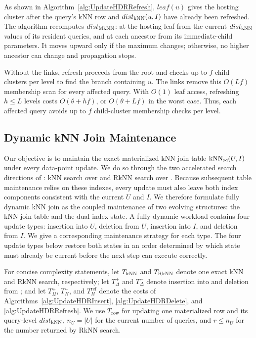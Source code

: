 As shown in Algorithm~\ref{alg:UpdateHDRRefresh}, $leaf(u)$ gives the hosting cluster after the query's kNN row and $dist_{\operatorname{kNN}}(u,I)$ have already been refreshed. The algorithm recomputes $dist_{\operatorname{MkNN}}$: at the hosting leaf from the current $dist_{\operatorname{kNN}}$ values of its resident queries, and at each ancestor from its immediate-child parameters. It moves upward only if the maximum changes; otherwise, no higher ancestor can change and propagation stops.

Without the links, refresh proceeds from the root and checks up to $f$ child clusters per level to find the branch containing $u$. The links remove this $O(Lf)$ membership scan for every affected query. With $O(1)$ leaf access, refreshing $h\leq L$ levels costs $O(\theta+hf)$, or $O(\theta+Lf)$ in the worst case. Thus, each affected query avoids up to $f$ child-cluster membership checks per level.

\subsection{Dynamic kNN Join Maintenance}
\label{subsec:dynamic-maintenance}

Our objective is to maintain the exact materialized kNN join table $\operatorname{kNN}_{\bowtie}(U,I)$ under every data-point update. We do so through the two accelerated search directions of \dualtree: kNN search over \deltatree and RkNN search over \hdrtree. Because subsequent table maintenance relies on these indexes, every update must also leave both index components consistent with the current $U$ and $I$. We therefore formulate fully dynamic kNN join as the coupled maintenance of two evolving structures: the kNN join table and the dual-index state. A fully dynamic workload contains four update types: insertion into $U$, deletion from $U$, insertion into $I$, and deletion from $I$. We give a corresponding maintenance strategy for each type. The four update types below restore both states in an order determined by which state must already be current before the next step can execute correctly.

For concise complexity statements, let $T_{\operatorname{kNN}}$ and $T_{\operatorname{RkNN}}$ denote one exact kNN and RkNN search, respectively; let $T_{\Delta}^{+}$ and $T_{\Delta}^{-}$ denote insertion into and deletion from \deltatree; and let $T_H^{+}$, $T_H^{-}$, and $T_H^{\mathrm{ref}}$ denote the costs of Algorithms~\ref{alg:UpdateHDRInsert}, \ref{alg:UpdateHDRDelete}, and \ref{alg:UpdateHDRRefresh}. We use $T_{\mathrm{row}}$ for updating one materialized row and its query-level $dist_{\operatorname{kNN}}$, $n_U=|U|$ for the current number of queries, and $r\leq n_U$ for the number returned by RkNN search.

